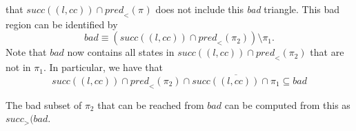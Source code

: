 \documentclass{article}
\newcommand{\placeholder}[1][]{\pi_{#1}}
\newcommand{\loc}{l}
\newcommand{\region}{\mathit{cc}}
\newcommand{\suc}{\mathit{succ}}
\newcommand{\pre}{\mathit{pred}}
\begin{document}
that $\suc((\loc, \region)) \cap \pre_{<}(\placeholder)$ does not include this
\emph{bad} triangle.
%
This bad region can be identified by
\begin{equation}
\mathit{bad} \equiv (\suc((\loc, \region)) \cap \pre_{<}(\placeholder[2])) \setminus \placeholder[1].
\end{equation}
Note that $\mathit{bad}$ now contains all states in
$\suc((\loc, \region)) \cap \pre_{<}(\placeholder[2])$ that are
not in $\placeholder[1]$. In particular, we have that
\begin{equation}
\suc((\loc, \region)) \cap \pre_{<}(\placeholder[2]) \cap \overline{\suc((\loc, \region)) \cap \placeholder[1]} \subseteq \mathit{bad}
\end{equation}

The bad subset of $\placeholder[2]$ that can be reached from $\mathit{bad}$
can be computed from this as $\suc_{>}(\mathit{bad}$.
\end{document}
